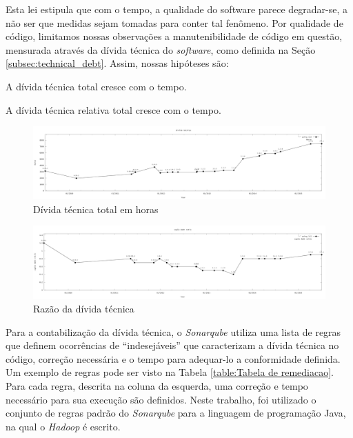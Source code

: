 Esta lei estipula que com o tempo, a qualidade do software parece degradar-se, a não ser que medidas sejam tomadas para conter tal fenômeno. Por qualidade de código, limitamos nossas observações a manutenibilidade de código em questão, mensurada através da dívida técnica do \textit{software}, como definida na Seção \ref{subsec:technical_debt}.
Assim, nossas hipóteses são:
\begin{hypothesis}
	A dívida técnica total cresce com o tempo.
\end{hypothesis}
\begin{hypothesis}
	A dívida técnica relativa total cresce com o tempo.
\end{hypothesis}
\begin{figure}[h]
	\centering
	\includegraphics[width=1\linewidth]{figure/Horas}
	\caption{Dívida técnica total em horas}
	\label{fig:horas}
\end{figure}
\begin{figure}[h]
	\centering
	\includegraphics[width=1\linewidth]{figure/sqale_debt_ratio}
	\caption{Razão da dívida técnica}
	\label{fig:sqaledebtratio}
\end{figure}

Para a contabilização da dívida técnica, o \textit{Sonarqube} utiliza uma lista de regras que definem ocorrências de ``indesejáveis'' que caracterizam a dívida técnica no código, correção necessária e o tempo para adequar-lo a conformidade definida. Um exemplo de regras pode ser visto na Tabela \ref{table:Tabela de remediacao}. Para cada regra, descrita na coluna da esquerda, uma correção e tempo necessário para sua execução são definidos. Neste trabalho, foi utilizado o conjunto de regras padrão do \textit{Sonarqube} para a linguagem de programação Java, na qual o \textit{Hadoop} é escrito.

